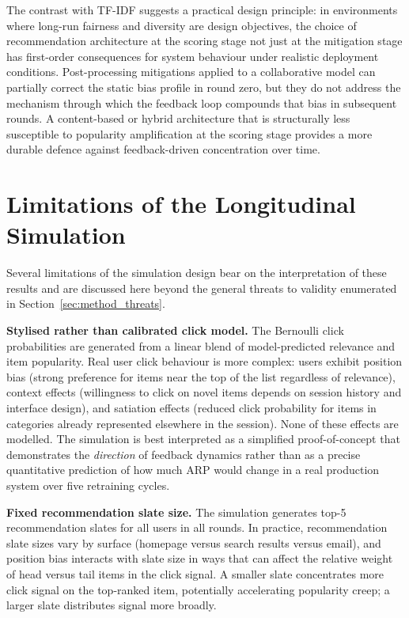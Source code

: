 \documentclass[11pt,a4paper]{report}
\begin{document}
The contrast with TF-IDF suggests a practical design principle: in environments where long-run fairness and diversity are design objectives, the choice of recommendation architecture at the scoring stage not just at the mitigation stage has first-order consequences for system behaviour under realistic deployment conditions. Post-processing mitigations applied to a collaborative model can partially correct the static bias profile in round zero, but they do not address the mechanism through which the feedback loop compounds that bias in subsequent rounds. A content-based or hybrid architecture that is structurally less susceptible to popularity amplification at the scoring stage provides a more durable defence against feedback-driven concentration over time.

\section{Limitations of the Longitudinal Simulation}
\label{sec:expc_limits}

Several limitations of the simulation design bear on the interpretation of these results and are discussed here beyond the general threats to validity enumerated in Section~\ref{sec:method_threats}.

\textbf{Stylised rather than calibrated click model.} The Bernoulli click probabilities are generated from a linear blend of model-predicted relevance and item popularity. Real user click behaviour is more complex: users exhibit position bias (strong preference for items near the top of the list regardless of relevance), context effects (willingness to click on novel items depends on session history and interface design), and satiation effects (reduced click probability for items in categories already represented elsewhere in the session). None of these effects are modelled. The simulation is best interpreted as a simplified proof-of-concept that demonstrates the \emph{direction} of feedback dynamics rather than as a precise quantitative prediction of how much ARP would change in a real production system over five retraining cycles.

\textbf{Fixed recommendation slate size.} The simulation generates top-5 recommendation slates for all users in all rounds. In practice, recommendation slate sizes vary by surface (homepage versus search results versus email), and position bias interacts with slate size in ways that can affect the relative weight of head versus tail items in the click signal. A smaller slate concentrates more click signal on the top-ranked item, potentially accelerating popularity creep; a larger slate distributes signal more broadly.
\end{document}
